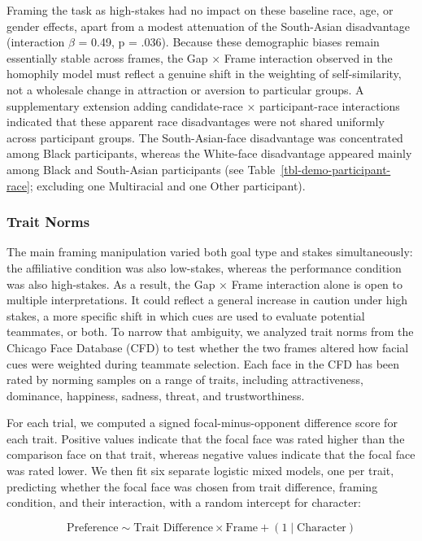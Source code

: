 \documentclass[
  man,
  floatsintext,
  longtable,
  nolmodern,
  notxfonts,
  notimes,
  draftfirst,
  colorlinks=true,linkcolor=blue,citecolor=blue,urlcolor=blue]{apa7}
\begin{document}
Framing the task as high-stakes had no impact on these baseline race,
age, or gender effects, apart from a modest attenuation of the
South-Asian disadvantage (interaction \(\beta\) = 0.49, p = .036).
Because these demographic biases remain essentially stable across
frames, the Gap × Frame interaction observed in the homophily model must
reflect a genuine shift in the weighting of self-similarity, not a
wholesale change in attraction or aversion to particular groups. A
supplementary extension adding candidate-race × participant-race
interactions indicated that these apparent race disadvantages were not
shared uniformly across participant groups. The South-Asian-face
disadvantage was concentrated among Black participants, whereas the
White-face disadvantage appeared mainly among Black and South-Asian
participants (see Table~\ref{tbl-demo-participant-race}; excluding one
Multiracial and one Other participant).

\subsubsection{Trait Norms}\label{trait-norms}

The main framing manipulation varied both goal type and stakes
simultaneously: the affiliative condition was also low-stakes, whereas
the performance condition was also high-stakes. As a result, the Gap ×
Frame interaction alone is open to multiple interpretations. It could
reflect a general increase in caution under high stakes, a more specific
shift in which cues are used to evaluate potential teammates, or both.
To narrow that ambiguity, we analyzed trait norms from the Chicago Face
Database (CFD) to test whether the two frames altered how facial cues
were weighted during teammate selection. Each face in the CFD has been
rated by norming samples on a range of traits, including attractiveness,
dominance, happiness, sadness, threat, and trustworthiness.

For each trial, we computed a signed focal-minus-opponent difference
score for each trait. Positive values indicate that the focal face was
rated higher than the comparison face on that trait, whereas negative
values indicate that the focal face was rated lower. We then fit six
separate logistic mixed models, one per trait, predicting whether the
focal face was chosen from trait difference, framing condition, and
their interaction, with a random intercept for character:

\[
\text{Preference} \sim \text{Trait Difference} \times \text{Frame} + (1 \mid \text{Character})
\]
\end{document}
